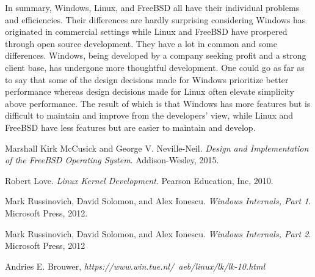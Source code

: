\documentclass[letterpaper,10pt,draftclsnofoot,onecolumn,]{IEEEtran}
\begin{document}
In summary, Windows, Linux, and FreeBSD all have their individual problems and efficiencies. Their differences are hardly surprising considering Windows has originated in commercial settings while Linux and FreeBSD have prospered through open source development. They have a lot in common and some differences. Windows, being developed by a company seeking profit and a strong client base, has undergone more thoughtful development. One could go as far as to say that some of the design decisions made for Windows prioritize better performance whereas design decisions made for Linux often elevate simplicity above performance. The result of which is that Windows has more features but is difficult to maintain and improve from the developers’ view, while Linux and FreeBSD have less features but are easier to maintain and develop.

\pagebreak

\begin{thebibliography}{9}
Marshall Kirk McCusick and George V. Neville-Neil. 
\textit{Design and Implementation of the FreeBSD Operating System}. 
Addison-Wesley, 2015.

Robert Love. 
\textit{Linux Kernel Development}. 
Pearson Education, Inc, 2010.
 
Mark Russinovich, David Solomon, and Alex Ionescu. 
\textit{Windows Internals, Part 1}. 
Microsoft Press, 2012.

Mark Russinovich, David Solomon, and Alex Ionescu. 
\textit{Windows Internals, Part 2}. 
Microsoft Press, 2012

Andries E. Brouwer,
\textit{https://www.win.tue.nl/~aeb/linux/lk/lk-10.html}

\end{thebibliography}
\end{document}
